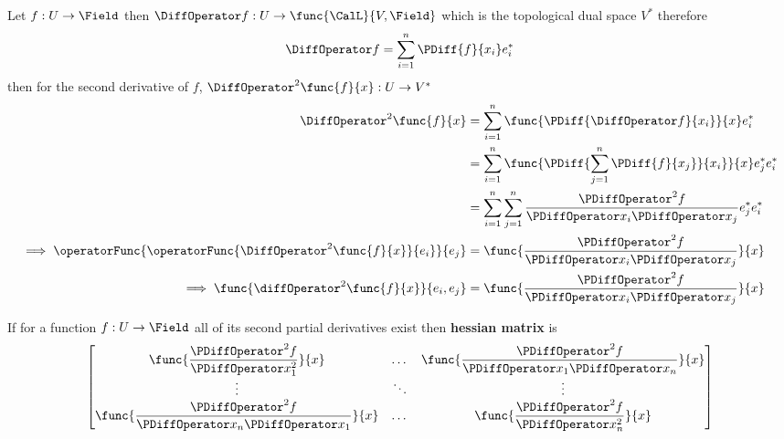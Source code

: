 Let \(f: U \to \Field\) then \(\DiffOperator f: U \to \func{\CalL}{V,\Field}\) which is the topological dual space \(V^\ast\) therefore
\begin{equation*}
    \DiffOperator f = \sum_{i = 1}^n \PDiff{f}{x_i} e^\ast_i
\end{equation*}
then for the second derivative of \(f\), \(\DiffOperator^2 \func{f}{x} : U \to V^\ast\)
\begin{align*}
    \DiffOperator^2 \func{f}{x}                                                  & = \sum_{i = 1}^n \func{\PDiff{\DiffOperator f}{x_i}}{x} e^\ast_i                                                     \\
                                                                                 & = \sum_{i = 1}^n \func{\PDiff{\sum_{j = 1}^n \PDiff{f}{x_j}}{x_i}}{x}  e^\ast_j e^\ast_i                             \\
                                                                                 & =  \sum_{i = 1}^n \sum_{j = 1}^n \dfrac{\PDiffOperator^2 f}{\PDiffOperator x_i \PDiffOperator x_j} e^\ast_j e^\ast_i \\
    \implies \operatorFunc{\operatorFunc{\DiffOperator^2 \func{f}{x}}{e_i}}{e_j} & = \func{\dfrac{\PDiffOperator^2 f}{\PDiffOperator x_i \PDiffOperator x_j}}{x}                                        \\
    \implies \func{\diffOperator^2 \func{f}{x}}{e_i,e_j}                         & = \func{\dfrac{\PDiffOperator^2 f}{\PDiffOperator x_i \PDiffOperator x_j}}{x}
\end{align*}

\begin{definition}
    If for a function \(f : U \to \Field\) all of its second partial derivatives exist then \textbf{hessian matrix} is
    \begin{equation*}
        \begin{bmatrix}
            \func{\dfrac{\PDiffOperator^2 f}{\PDiffOperator x_1^2}}{x}                  & \dots  & \func{\dfrac{\PDiffOperator^2 f}{\PDiffOperator x_1 \PDiffOperator x_n}}{x} \\
            \vdots                                                                      & \ddots & \vdots                                                                      \\
            \func{\dfrac{\PDiffOperator^2 f}{\PDiffOperator x_n \PDiffOperator x_1}}{x} & \dots  & \func{\dfrac{\PDiffOperator^2 f}{\PDiffOperator x_n^2}}{x}
        \end{bmatrix}
    \end{equation*}
\end{definition}

